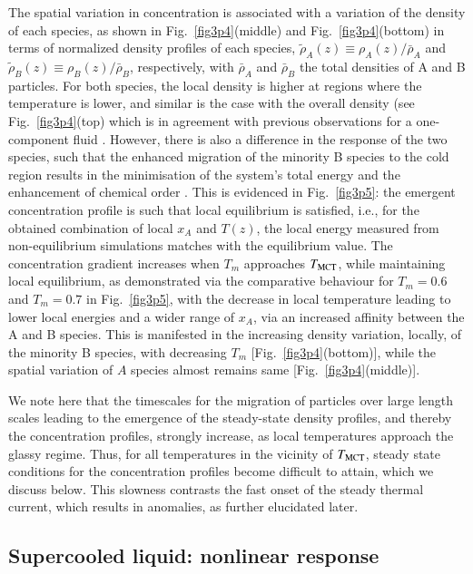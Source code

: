 The spatial variation in concentration is associated with a variation of the density of each species, as shown in Fig.~\ref{fig3p4}(middle) and Fig.~\ref{fig3p4}(bottom) in terms of normalized density profiles of each species, $\tilde{\rho}_A(z)\equiv\rho_A(z)/\bar{\rho}_A$ and $\tilde{\rho}_B(z)\equiv\rho_B(z)/\bar{\rho}_B$, respectively, with $\bar{\rho}_A$ and $\bar{\rho}_B$ the total densities of A and B particles. For both species, the local density is higher at regions where the temperature is lower, {and similar  is the case with the overall density (see Fig.~\ref{fig3p4}(top) which is in agreement with} previous observations for a one-component fluid \cite{baranyai}. {However, there is also a difference in the response of the two species, such that the enhanced migration of the minority B species to the cold region results in the minimisation of the system's total energy and the enhancement of chemical order \cite{cargill}. This is evidenced in Fig.~\ref{fig3p5}: the emergent concentration profile is such that local equilibrium is satisfied, i.e., for the obtained combination of local $x_A$ and $T(z)$, the local energy measured from non-equilibrium simulations matches with the equilibrium value. The concentration gradient increases when $T_m$ approaches $T_{\rm MCT}$, while maintaining local equilibrium, as demonstrated via the comparative behaviour for $T_m=0.6$ and $T_m=0.7$ in Fig.~\ref{fig3p5}, with the decrease in local temperature leading to lower local energies and a wider range of $x_A$, via an increased affinity between the A and B species. This is manifested} in the increasing density variation, locally, of the minority B species, with decreasing $T_m$ [Fig.~\ref{fig3p4}(bottom)], while the spatial variation of $A$ species almost remains same [Fig.~\ref{fig3p4}(middle)].

We note here that the timescales for the migration of particles over large length scales leading to the emergence of the steady-state density profiles, and thereby the concentration profiles, strongly increase, as local temperatures approach the glassy regime. Thus, for all temperatures in the vicinity of $T_{\rm MCT}$, steady state conditions for the concentration profiles become difficult to attain, which we discuss below. This slowness contrasts the fast onset of the steady thermal current, which results in anomalies, as further elucidated later.

\subsection{Supercooled liquid: nonlinear response} 

